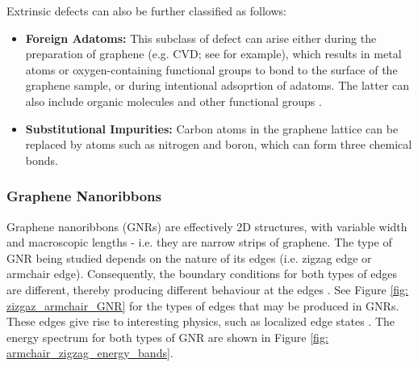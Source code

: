 \documentclass[]{article}
\begin{document}
Extrinsic defects can also be further classified as follows:

\begin{itemize}
	\item \textbf{Foreign Adatoms:} This subclass of defect can arise either during the preparation of graphene (e.g. CVD; see \cite{synthesis_GNR_metal_oxide} for example), which results in metal atoms or oxygen-containing functional groups to bond to the surface of the graphene sample, or during intentional adsoprtion of adatoms. The latter can also include organic molecules and other functional groups \cite{bandgap_engineering_edge_functionalization_organic, bandgap_tuning_hydrogenated_graphene}.
	
	\item \textbf{Substitutional Impurities:} Carbon atoms in the graphene lattice can be replaced by atoms such as nitrogen and boron, which can form three chemical bonds.
\end{itemize}


\subsubsection{Graphene Nanoribbons}
Graphene nanoribbons (GNRs) are effectively 2D structures, with variable width and macroscopic lengths - i.e. they are narrow strips of graphene. The type of GNR being studied depends on the nature of its edges (i.e. zigzag edge or armchair edge). Consequently, the boundary conditions for both types of edges are different, thereby producing different behaviour at the edges \cite{The_Electronic_Properties_of_Graphene}. See Figure \ref{fig: zizgaz_armchair_GNR} for the types of edges that may be produced in GNRs. These edges give rise to interesting physics, such as localized edge states \cite{bandgap_engineering_GNR_edge_dihydrogenation, Edge_passivation_AGNR_bandgap_engineering, QD_edge_modulated_GNR, Properties_of_graphene:_a_theoretical_perspective}. The energy spectrum for both types of GNR are shown in Figure \ref{fig: armchair_zigzag_energy_bands}.
\newline
\end{document}
